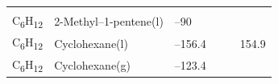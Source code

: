 \documentclass[
]{book}
\theoremstyle{definition}
\theoremstyle{definition}
\theoremstyle{definition}
\theoremstyle{remark}
\begin{document}
\begin{longtable}[]{@{}llllll@{}}
\begin{minipage}[t]{0.14\columnwidth}
\strut
\end{minipage}\tabularnewline
\begin{minipage}[t]{0.07\columnwidth}\raggedright
C\textsubscript{6}H\textsubscript{12}\strut
\end{minipage} & \begin{minipage}[t]{0.17\columnwidth}\raggedright
2-Methyl--1-pentene(l)\strut
\end{minipage} & \begin{minipage}[t]{0.15\columnwidth}\raggedright
--90\strut
\end{minipage} & \begin{minipage}[t]{0.15\columnwidth}\raggedright
\strut
\end{minipage} & \begin{minipage}[t]{0.14\columnwidth}\raggedright
\strut
\end{minipage} & \begin{minipage}[t]{0.14\columnwidth}\raggedright
\strut
\end{minipage}\tabularnewline
\begin{minipage}[t]{0.07\columnwidth}\raggedright
C\textsubscript{6}H\textsubscript{12}\strut
\end{minipage} & \begin{minipage}[t]{0.17\columnwidth}\raggedright
Cyclohexane(l)\strut
\end{minipage} & \begin{minipage}[t]{0.15\columnwidth}\raggedright
--156.4\strut
\end{minipage} & \begin{minipage}[t]{0.15\columnwidth}\raggedright
\strut
\end{minipage} & \begin{minipage}[t]{0.14\columnwidth}\raggedright
\strut
\end{minipage} & \begin{minipage}[t]{0.14\columnwidth}\raggedright
154.9\strut
\end{minipage}\tabularnewline
\begin{minipage}[t]{0.07\columnwidth}\raggedright
C\textsubscript{6}H\textsubscript{12}\strut
\end{minipage} & \begin{minipage}[t]{0.17\columnwidth}\raggedright
Cyclohexane(g)\strut
\end{minipage} & \begin{minipage}[t]{0.15\columnwidth}\raggedright
--123.4\strut
\end{minipage} & \begin{minipage}[t]{0.15\columnwidth}\raggedright

\end{minipage}
\end{longtable}
\end{document}
